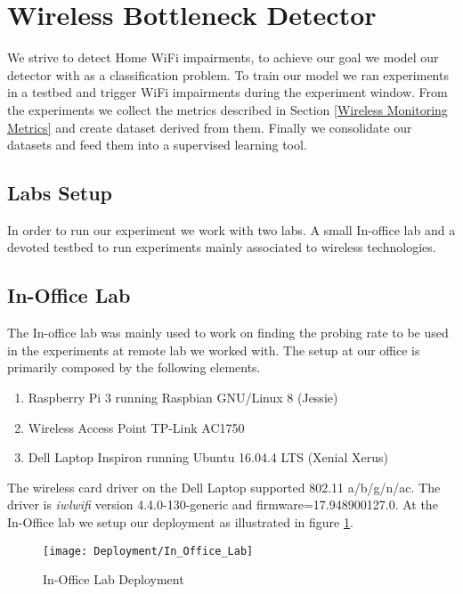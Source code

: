 \section{Wireless Bottleneck Detector}\label{Wireless Bottleneck Detector}

We strive to detect Home WiFi impairments, to achieve our goal we model our detector with as a classification problem. To train our model we ran experiments in a testbed and trigger WiFi impairments during the experiment window. From the experiments we collect the metrics described in Section \ref{Wireless Monitoring Metrics} and create dataset derived from them. Finally we consolidate our datasets and feed them into a supervised learning tool. 

\subsection{Labs Setup}

In order to run our experiment we work with two labs. A small In-office lab and a devoted testbed to run experiments mainly associated to wireless technologies.

\subsection*{In-Office Lab}

The In-office lab was mainly used to work on finding the probing rate to be used in the experiments at remote lab we worked with. The setup at our office is primarily composed by the following elements.

\begin{enumerate}
	\item Raspberry Pi 3 running Raspbian GNU/Linux 8 (Jessie)
	\item Wireless Access Point TP-Link AC1750
	\item Dell Laptop Inspiron running Ubuntu 16.04.4 LTS (Xenial Xerus)
\end{enumerate}
	
	The wireless card driver on the Dell Laptop supported 802.11 a/b/g/n/ac. The driver is \textit{iwlwifi} version 4.4.0-130-generic and firmware=17.948900127.0. At the In-Office lab we setup our deployment as illustrated in figure \ref{image:In_Office_Lab_Deployment}.
	
\begin{figure}[h]
	\centering
	\texttt{[image: Deployment/In\_Office\_Lab]}
	\caption{In-Office Lab Deployment}
	\label{image:In_Office_Lab_Deployment}
\end{figure}
		
